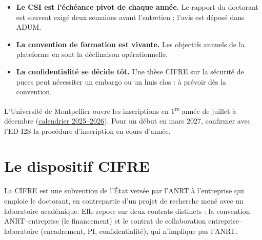 \documentclass[11pt,a4paper]{article}
\begin{document}
\begin{apretenir}
\begin{itemize}[leftmargin=*]
  \item \textbf{Le CSI est l'échéance pivot de chaque année.} Le rapport du doctorant
  est souvent exigé deux semaines avant l'entretien ; l'avis est déposé dans ADUM.
  \item \textbf{La convention de formation est vivante.} Les objectifs annuels de la
  plateforme en sont la déclinaison opérationnelle.
  \item \textbf{La confidentialité se décide tôt.} Une thèse CIFRE sur la sécurité de
  puces peut nécessiter un embargo ou un huis clos : à prévoir dès la convention.
\end{itemize}
\end{apretenir}

\begin{question}
L'Université de Montpellier ouvre les inscriptions en 1\textsuperscript{re} année de
juillet à décembre
(\href{https://ed461.edu.umontpellier.fr/files/2025/08/IDD_Calendrier-Inscriptions-Administratives_2025-2026.pdf}{calendrier 2025--2026}).
Pour un début en mars 2027, confirmer avec l'ED I2S la procédure d'inscription en
cours d'année.
\end{question}

\section{Le dispositif CIFRE}

La CIFRE est une subvention de l'État versée par l'ANRT à l'entreprise qui emploie le
doctorant, en contrepartie d'un projet de recherche mené avec un laboratoire
académique. Elle repose sur deux contrats distincts : la convention ANRT--entreprise
(le financement) et le contrat de collaboration entreprise--laboratoire
(encadrement, PI, confidentialité), qui n'implique pas l'ANRT.
\end{document}
